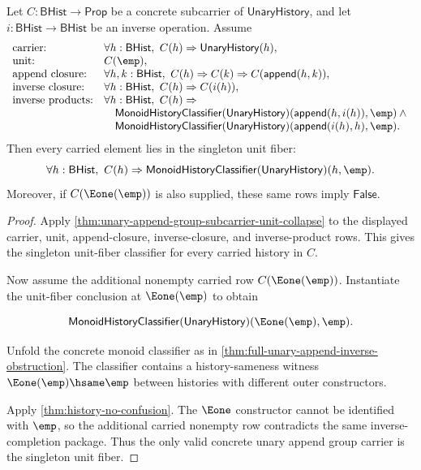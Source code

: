 \begin{theorem}
\label{thm:group-unary-append-inverse-completion-singleton-boundary}
Let $C:\mathsf{BHist}\to\mathsf{Prop}$ be a concrete subcarrier of
$\mathsf{UnaryHistory}$, and let $i:\mathsf{BHist}\to\mathsf{BHist}$ be an
inverse operation. Assume
$$
\begin{array}{ll}
\text{\rm carrier:} &
\forall h:\mathsf{BHist},\ C(h)\Rightarrow \mathsf{UnaryHistory}(h),\\
\text{\rm unit:} & C(\emp),\\
\text{\rm append closure:} &
\forall h,k:\mathsf{BHist},\
C(h)\Rightarrow C(k)\Rightarrow C(\mathsf{append}(h,k)),\\
\text{\rm inverse closure:} &
\forall h:\mathsf{BHist},\
C(h)\Rightarrow C(i(h)),\\
\text{\rm inverse products:} &
\forall h:\mathsf{BHist},\
C(h)\Rightarrow{}\\
&\quad
\mathsf{MonoidHistoryClassifier}(\mathsf{UnaryHistory})
(\mathsf{append}(h,i(h)),\emp)\land{}\\
&\quad
\mathsf{MonoidHistoryClassifier}(\mathsf{UnaryHistory})
(\mathsf{append}(i(h),h),\emp).
\end{array}
$$
Then every carried element lies in the singleton unit fiber:
$$
\forall h:\mathsf{BHist},\
C(h)\Rightarrow
\mathsf{MonoidHistoryClassifier}(\mathsf{UnaryHistory})(h,\emp).
$$
Moreover, if $C(\Eone(\emp))$ is also supplied, these same rows imply
$\mathsf{False}$.
\end{theorem}
\begin{proof}
Apply \autoref{thm:unary-append-group-subcarrier-unit-collapse} to the
displayed carrier, unit, append-closure, inverse-closure, and inverse-product
rows. This gives the singleton unit-fiber classifier for every carried history
in $C$.

Now assume the additional nonempty carried row $C(\Eone(\emp))$. Instantiate
the unit-fiber conclusion at $\Eone(\emp)$ to obtain

$$
\mathsf{MonoidHistoryClassifier}(\mathsf{UnaryHistory})(\Eone(\emp),\emp).
$$

Unfold the concrete monoid classifier as in
\autoref{thm:full-unary-append-inverse-obstruction}. The classifier contains a
history-sameness witness $\Eone(\emp)\hsame\emp$ between histories with
different outer constructors.

Apply \autoref{thm:history-no-confusion}. The $\Eone$ constructor cannot be
identified with $\emp$, so the additional carried nonempty row contradicts the
same inverse-completion package. Thus the only valid concrete unary append
group carrier is the singleton unit fiber.
\end{proof}

